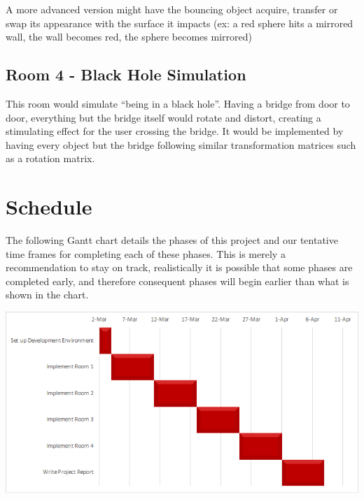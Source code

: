 \documentclass[12pt,a4paper]{report}
\begin{document}
\par A more advanced version might have the bouncing object acquire, transfer or swap its appearance with the surface it impacts (ex: a red sphere hits a mirrored wall, the wall becomes red, the sphere becomes mirrored)

\subsection*{Room 4 - Black Hole Simulation}
\par This room would simulate “being in a black hole”. Having a bridge from door to door, everything but the bridge itself would rotate and distort, creating a stimulating effect for the user crossing the bridge. It would be implemented by having every object but the bridge following similar transformation matrices such as a rotation matrix.

\pagebreak

\section*{Schedule}
\par The following Gantt chart details the phases of this project and our tentative time frames for completing each of these phases. This is merely a recommendation to stay on track, realistically it is possible that some phases are completed early, and therefore consequent phases will begin earlier than what is shown in the chart.
\begin{center}
\includegraphics[width=1\textwidth]{img/schedule.png}
\end{center}
\end{document}
